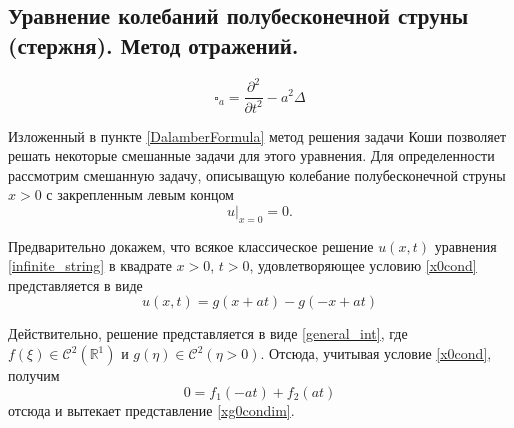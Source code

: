 \subsection{Уравнение колебаний полубесконечной струны (стержня). Метод отражений.}

\begin{equation}
	\square_{a} = \frac{\partial^2}{\partial t^2} - a^2 \Delta
\end{equation}

Изложенный в пункте \ref{DalamberFormula} метод решения задачи Коши позволяет решать некоторые смешанные задачи для этого уравнения. Для определенности рассмотрим смешанную задачу, описыващую колебание полубесконечной струны $x > 0$ с закрепленным левым концом
\begin{equation} \label{x0cond}
	u |_{x = 0} = 0.
\end{equation}

Предварительно докажем, что всякое классическое решение $u(x, t)$ уравнения \eqref{infinite_string} в квадрате $x > 0$, $t > 0$, удовлетворяющее условию \eqref{x0cond} представляется в виде 
\begin{equation} \label{xg0condim}
	u(x, t) = g(x + a t) - g(-x + a t)
\end{equation}

Действительно, решение представляется в виде \eqref{general_int}, где $f(\xi) \in \mathcal{C}^2(\mathbb{R}^1)$ и $g(\eta) \in \mathcal{C}^2(\eta > 0)$. Отсюда, учитывая условие \eqref{x0cond}, получим
\begin{equation} 
	0 = f_1(-a t) + f_2(a t)
\end{equation}
отсюда и вытекает представление \eqref{xg0condim}. 

